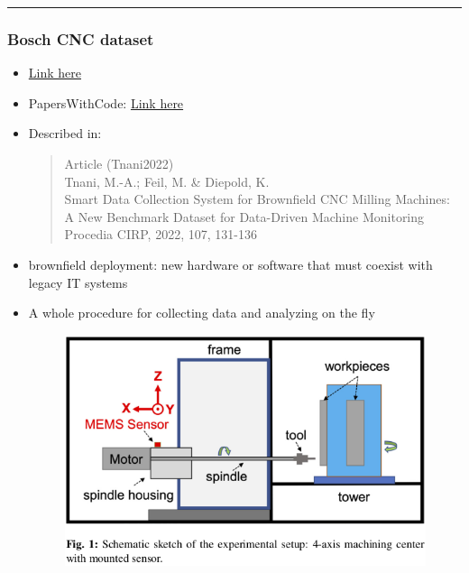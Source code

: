 \documentclass[
  letterpaper,
  DIV=11,
  numbers=noendperiod]{scrartcl}
\begin{document}
\begin{center}\rule{0.5\linewidth}{0.5pt}\end{center}

\hypertarget{bosch-cnc-dataset}{%
\subsubsection{Bosch CNC dataset}\label{bosch-cnc-dataset}}

\begin{itemize}
\item
  \href{https://github.com/boschresearch/CNC_Machining}{Link here}
\item
  PapersWithCode:
  \href{https://paperswithcode.com/dataset/bosch-cnc-machining-dataset}{Link
  here}
\item
  Described in:

  \begin{quote}
  Article (Tnani2022)\\
  Tnani, M.-A.; Feil, M. \& Diepold, K.\\
  Smart Data Collection System for Brownfield CNC Milling Machines: A
  New Benchmark Dataset for Data-Driven Machine Monitoring\\
  Procedia CIRP, 2022, 107, 131-136
  \end{quote}
\item
  brownfield deployment: new hardware or software that must coexist with
  legacy IT systems
\item
  A whole procedure for collecting data and analyzing on the fly

  \begin{figure}

  {\centering \includegraphics{img/2023-01-29-16-21-13.png}

}
\end{figure}
\end{itemize}
\end{document}
